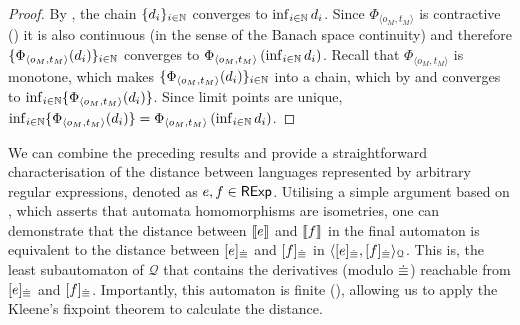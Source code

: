 \begin{proof}
 By , the chain $\{d_i\}_{i \in \mathbb{N}}$ converges to $\inf_{i \in \mathbb{N}} d_i$. Since $\Phi_{\langle o_M, t_M\rangle}$ is contractive () it is also continuous (in the sense of the Banach space continuity) and therefore $\{\Phi_{\langle o_M, t_M\rangle}(d_i)\}_{i \in \mathbb{N}}$ converges to $\Phi_{\langle o_M, t_M\rangle} \left(\inf_{i \in \mathbb{N}} d_i\right)$. Recall that $\Phi_{\langle o_M, t_M\rangle}$ is monotone, which makes $\{\Phi_{\langle o_M, t_M\rangle}(d_i)\}_{i \in \mathbb{N}}$ into a chain, which by  and  converges to $\inf_{i \in \mathbb{N}} \{\Phi_{\langle o_M, t_M\rangle} (d_i)\}$. Since limit points are unique, $\inf_{i \in \mathbb{N}} \{\Phi_{\langle o_M, t_M\rangle} (d_i)\} = \Phi_{\langle o_M, t_M\rangle} \left(\inf_{i \in \mathbb{N}} d_i\right)$.
\end{proof}
We can combine the preceding results and provide a straightforward characterisation of the distance between languages represented by arbitrary regular expressions, denoted as $e, f \in \mathsf{RExp}$. Utilising a simple argument based on , which asserts that automata homomorphisms are isometries, one can demonstrate that the distance between $\left\llbracket{e}\right\rrbracket$ and $\left\llbracket{f}\right\rrbracket$ in the final automaton is equivalent to the distance between $[e]_{{\mathrel{\dot\equiv}}}$ and $[f]_{{\mathrel{\dot\equiv}}}$ in $\langle [e]_{{\mathrel{\dot\equiv}}},[f]_{{\mathrel{\dot\equiv}}} \rangle_{\mathcal{Q}}$. This is, the least subautomaton of $\mathcal{Q}$ that contains the derivatives (modulo ${\mathrel{\dot\equiv}}$) reachable from $[e]_{{\mathrel{\dot\equiv}}}$ and $[f]_{{\mathrel{\dot\equiv}}}$. Importantly, this automaton is finite (), allowing us to apply the Kleene's fixpoint theorem to calculate the distance.

